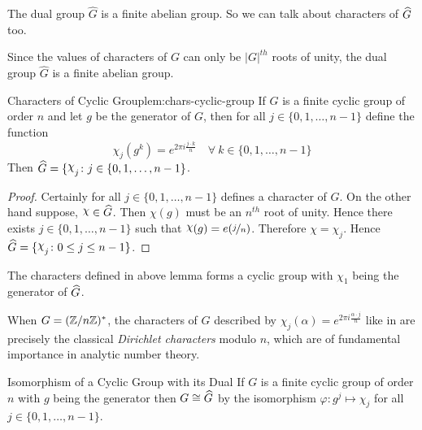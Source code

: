 \begin{observation}
  The dual group $\widehat{G}$ is a finite abelian group. So we can talk about characters of $\widehat{G}$ too.
\end{observation}
Since the values of characters of $G$ can only be $|G|^{th}$ roots of unity, the dual group $\widehat{G}$ is a finite abelian group.
\begin{lemma}{Characters of Cyclic Group}{lem:chars-cyclic-group}
  If $G$ is a finite cyclic group of order $n$ and let $g$ be the generator of $G$, then for all $j\in\{0,1,\dots, n-1\}$ define the function $$\chi_j(g^k)=e^{2\pi i\frac{j\cdot k}{n}} \quad \forall\ k\in \{0,1,\dots, n-1\}$$Then $\hG=\{\chi_j\colon j\in\{0,1,\dots, n-1\}$.
\end{lemma}
\begin{proof}
  Certainly for all $j\in\{0,1,\dots, n-1\}$ defines a character of $G$. On the other hand suppose, $\chi\in\hG$. Then $\chi(g)$ must be an $n^{th}$ root of unity. Hence there exists $j\in\{0,1,\dots, n-1\}$ such that $\chi(g)=e(\nicefrac{j}{n})$. Therefore $\chi=\chi_j$. Hence $\hG=\{\chi_j\colon  0\leq j\leq n-1\}$.
\end{proof}
\begin{observation}
  The characters defined in above lemma forms a cyclic group with $\chi_1$ being the generator of $\widehat{G}$.
\end{observation}
\begin{note}
  When $G=(\mathbb{Z}/n\mathbb{Z})^*$, the characters of $G$ described by $\chi_j(\alpha)=e^{2\pi i\frac{\alpha\cdot j}{n}}$ like in  are precisely the classical \emph{Dirichlet characters} modulo $n$, which are of fundamental importance in analytic number theory.
\end{note}
\begin{corolary}{Isomorphism of a Cyclic Group with its Dual}{}
  If $G$ is a finite cyclic group of order $n$ with $g$ being the generator then $G\cong \widehat{G}$ by the isomorphism $\varphi:g^j\mapsto \chi_j$ for all $j\in\{0,1,\dots, n-1\}$.
\end{corolary}

